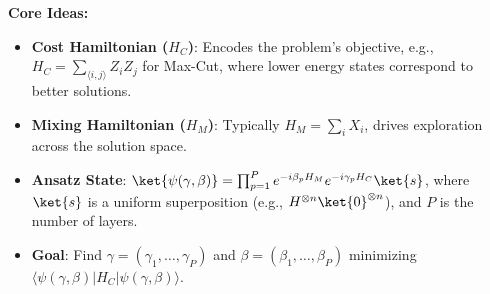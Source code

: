 \noindent
\textbf{Core Ideas:}
\begin{itemize}
  \item \textbf{Cost Hamiltonian ($H_C$)}: Encodes the problem's objective,
    e.g., $H_C = \sum_{\langle i,j \rangle} Z_i Z_j$ for Max-Cut, where lower
    energy states correspond to better solutions.

    \vspace{0.3cm}

  \item \textbf{Mixing Hamiltonian ($H_M$)}: Typically $H_M = \sum_i X_i$,
    drives exploration across the solution space.

    \vspace{0.3cm}

  \item \textbf{Ansatz State}: $\ket{\psi(\gamma, \beta)} = \prod_{p=1}^P
    e^{-i\beta_p H_M} e^{-i\gamma_p H_C} \ket{s}$, where $\ket{s}$ is a
    uniform superposition (e.g., $H^{\otimes n} \ket{0}^{\otimes n}$), and
    $P$ is the number of layers.

    \vspace{0.3cm}

  \item \textbf{Goal}: Find $\gamma = (\gamma_1, \ldots, \gamma_P)$ and
    $\beta = (\beta_1, \ldots, \beta_P)$ minimizing $\langle \psi(\gamma,
    \beta) | H_C | \psi(\gamma, \beta) \rangle$.

\end{itemize}

\vspace{0.3cm}


\vspace{0.3cm}

